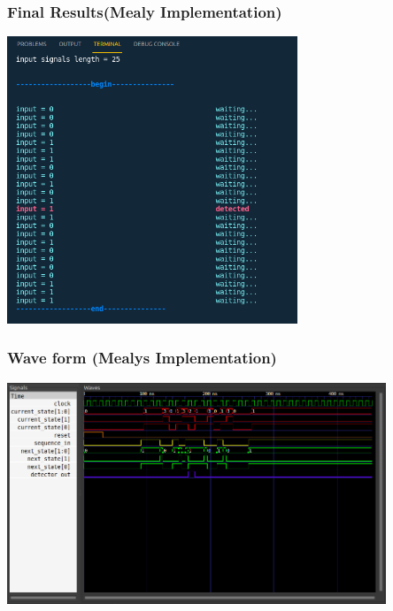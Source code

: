 \documentclass[xcolor=table]{beamer}
\begin{document}
\begin{frame}
  \frametitle{Final Results(Mealy Implementation)}
  \centering
  \includegraphics[width=0.65\textwidth, height=0.85\textheight]{./static/res_mealy_sim.png}
\end{frame}


\begin{frame}
  \frametitle{Wave form (Mealys Implementation)}
  \centering
  \includegraphics[width=0.85\textwidth, height=0.65\textheight]{./static/res_wave_mealy.png}
\end{frame}
\end{document}
